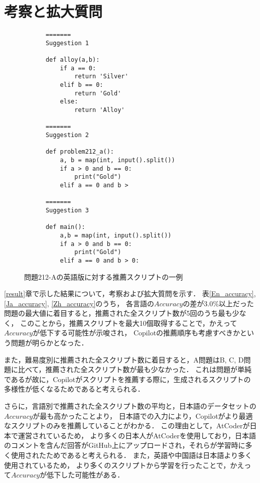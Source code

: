 \section{考察と拡大質問\label{consideration}}
  \begin{figure}[t]
    \begin{verbatim}
      =======
      Suggestion 1

      def alloy(a,b):
          if a == 0:
              return 'Silver'
          elif b == 0:
              return 'Gold'
          else:
              return 'Alloy'

      =======
      Suggestion 2

      def problem212_a():
          a, b = map(int, input().split())
          if a > 0 and b == 0:
              print("Gold")
          elif a == 0 and b >

      =======
      Suggestion 3

      def main():
          a,b = map(int, input().split())
          if a > 0 and b == 0:
              print("Gold")
          elif a == 0 and b > 0:
    \end{verbatim}
    \label{recommend_212_A_en}
    \caption{問題212-Aの英語版に対する推薦スクリプトの一例}
  \end{figure}
  \ref{result}章で示した結果について，考察および拡大質問を示す．
  表\ref{En_accuracy}, \ref{Ja_accuracy}, \ref{Zh_accuracy}のうち，
  各言語の$Accuracy$の差が3.0\%以上だった問題の最大値に着目すると，推薦された全スクリプト数が5回のうち最も少なく，
  このことから，推薦スクリプトを最大10個取得することで，かえって$Accuracy$が低下する可能性が示唆され，
  Copilotの推薦順序も考慮すべきかという問題が明らかとなった．

  また，難易度別に推薦された全スクリプト数に着目すると，A問題はB, C, D問題に比べて，推薦された全スクリプト数が最も少なかった．
  これは問題が単純であるが故に，Copilotがスクリプトを推薦する際に，生成されるスクリプトの多様性が低くなるためであると考えられる．

  さらに，言語別で推薦された全スクリプト数の平均と，日本語のデータセットの$Accuracy$が最も高かったことより，
  日本語での入力により，Copilotがより最適なスクリプトのみを推薦していることがわかる．
  この理由として，AtCoder\cite{AtCoder}が日本で運営されているため，
  より多くの日本人がAtCoderを使用しており，日本語のコメントを含んだ回答がGitHub上にアップロードされ，それらが学習時に多く使用されたためであると考えられる．
  また，英語や中国語は日本語より多く使用されているため，
  より多くのスクリプトから学習を行ったことで，かえって$Accuracy$が低下した可能性がある．    

